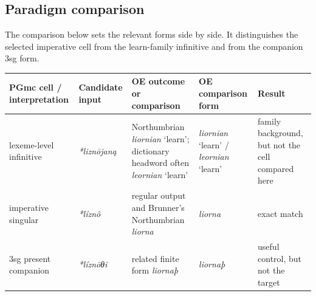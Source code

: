 \documentclass[
  british,
  a4paper,
  openany]{book}
\newcounter{none} %
\begin{document}
\subsection{Paradigm comparison}\label{paradigm-comparison-22}

The comparison below sets the relevant forms side by side. It
distinguishes the selected imperative cell from the learn-family
infinitive and from the companion 3sg form.

{\def\LTcaptype{none} %
\begin{longtable}[]{@{}
  >{\raggedright\arraybackslash}p{}
  >{\raggedright\arraybackslash}p{}
  >{\raggedright\arraybackslash}p{}
  >{\raggedright\arraybackslash}p{}
  >{\raggedright\arraybackslash}p{}@{}}
\toprule\noalign{}
\begin{minipage}[b]{\linewidth}\raggedright
PGmc cell / interpretation
\end{minipage} & \begin{minipage}[b]{\linewidth}\raggedright
Candidate input
\end{minipage} & \begin{minipage}[b]{\linewidth}\raggedright
OE outcome or comparison
\end{minipage} & \begin{minipage}[b]{\linewidth}\raggedright
OE comparison form
\end{minipage} & \begin{minipage}[b]{\linewidth}\raggedright
Result
\end{minipage} \\
\midrule\noalign{}
\endhead
\bottomrule\noalign{}
\endlastfoot
lexeme-level infinitive & {\emph{*liznōjaną}} & Northumbrian
{\emph{liornian}} `learn'; dictionary headword often {\emph{leornian}}
`learn' & {\emph{liornian}} `learn' / {\emph{leornian}} `learn' & family
background, but not the cell compared here \\
imperative singular & {\emph{*líznô}} & regular output and Brunner's
Northumbrian {\emph{liorna}} & {\emph{liorna}} & exact match \\
3sg present companion & {\emph{*líznōθi}} & related finite form
{\emph{liornaþ}} & {\emph{liornaþ}} & useful control, but not the
target \\
\end{longtable}
}
\end{document}
